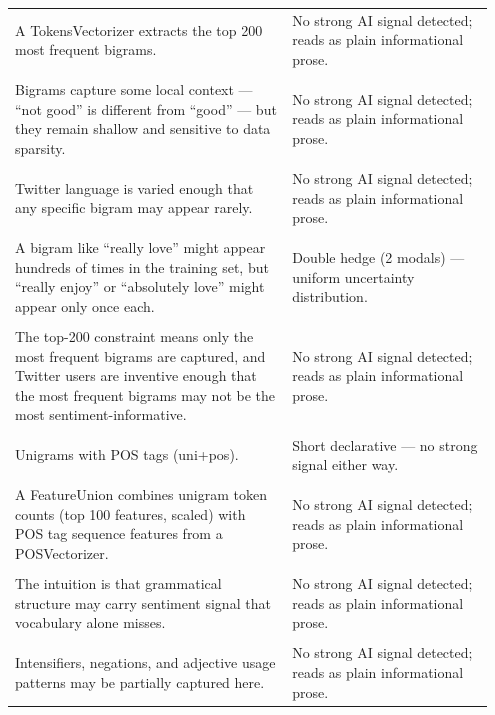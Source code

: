 \documentclass[11pt]{article}
\begin{document}
\begin{longtable}{|p{0.55\linewidth}|p{0.40\linewidth}|}
\hline
\rule{0pt}{3.5cm} & \\
\hline
A TokensVectorizer extracts the top 200 most frequent bigrams. & No strong AI signal detected; reads as plain informational prose. \\[2pt]
\hline
\rule{0pt}{3.5cm} & \\
\hline
Bigrams capture some local context --- ``not good'' is different from ``good'' --- but they remain shallow and sensitive to data sparsity. & No strong AI signal detected; reads as plain informational prose. \\[2pt]
\hline
\rule{0pt}{3.5cm} & \\
\hline
Twitter language is varied enough that any specific bigram may appear rarely. & No strong AI signal detected; reads as plain informational prose. \\[2pt]
\hline
\rule{0pt}{3.5cm} & \\
\hline
A bigram like ``really love'' might appear hundreds of times in the training set, but ``really enjoy'' or ``absolutely love'' might appear only once each. & Double hedge (2 modals) --- uniform uncertainty distribution. \\[2pt]
\hline
\rule{0pt}{3.5cm} & \\
\hline
The top-200 constraint means only the most frequent bigrams are captured, and Twitter users are inventive enough that the most frequent bigrams may not be the most sentiment-informative. & No strong AI signal detected; reads as plain informational prose. \\[2pt]
\hline
\rule{0pt}{3.5cm} & \\
\hline
Unigrams with POS tags (uni+pos). & Short declarative --- no strong signal either way. \\[2pt]
\hline
\rule{0pt}{3.5cm} & \\
\hline
A FeatureUnion combines unigram token counts (top 100 features, scaled) with POS tag sequence features from a POSVectorizer. & No strong AI signal detected; reads as plain informational prose. \\[2pt]
\hline
\rule{0pt}{3.5cm} & \\
\hline
The intuition is that grammatical structure may carry sentiment signal that vocabulary alone misses. & No strong AI signal detected; reads as plain informational prose. \\[2pt]
\hline
\rule{0pt}{3.5cm} & \\
\hline
Intensifiers, negations, and adjective usage patterns may be partially captured here. & No strong AI signal detected; reads as plain informational prose. \\[2pt]

\end{longtable}
\end{document}
